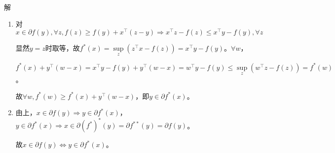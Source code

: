 \documentclass[cn,hazy,cyan,11pt,normal]{elegantnote}
\begin{document}
\begin{enumerate}
            \vspace{0.5cm}\textcolor{c2}解

            \begin{enumerate}
                \item 对$x\in\partial f(y),\forall z,f(z)\geq f(y)+x^{\top}(z-y)\Rightarrow x^{\top}z-f(z)\leq x^{\top}y-f(y),\forall z$

                    显然$y=z$时取等，故$f^*(x)=\sup\limits_z(z^{\top}x-f(z))= x^{\top}y-f(y)$。$\forall w$，

                    $f^*(x)+y^{\top}(w-x)=x^{\top}y-f(y)+y^{\top}(w-x)=w^{\top}y-f(y)\leq\sup\limits_z(w^{\top}z-f(z))=f^*(w)$。

                    故$\forall w,f^*(w)\geq f^*(x)+y^{\top}(w-x)$，即$y\in\partial f^*(x)$。
                \item 由上，$x\in\partial f(y)\Rightarrow y\in\partial f^*(x)$，$y\in\partial f^*(x)\Rightarrow x\in\partial (f^*)^*(y)=\partial f^{**}(y)=\partial f(y)$。

                    故$x\in\partial f(y)\Leftrightarrow y\in\partial f^*(x)$。
            \end{enumerate}

    \end{enumerate}
\end{document}
